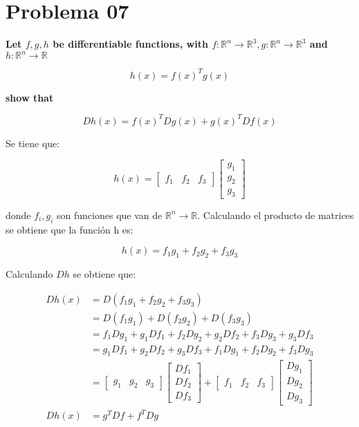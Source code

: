 \section*{Problema 07}

\textbf{Let $f,g,h$ be differentiable functions, with $f: \mathbb{R}^n \rightarrow \mathbb{R}^3, g: \mathbb{R}^n \rightarrow \mathbb{R}^3$ and $h: \mathbb{R}^n \rightarrow \mathbb{R}$}

\begin{equation*}
    h(x) = f(x)^Tg(x)
\end{equation*}

\textbf{show that}

\begin{equation*}
    Dh(x) = f(x)^TDg(x)+g(x)^TDf(x)
\end{equation*}

Se tiene que:

\begin{equation*}
    h(x) = \begin{bmatrix}
        f_1 & f_2 & f_3
    \end{bmatrix} \begin{bmatrix}
        g_1 \\ g_2 \\ g_3
    \end{bmatrix}
\end{equation*}

donde $f_i,g_i$ son funciones que van de $\mathbb{R}^n\rightarrow \mathbb{R}$. Calculando el producto de matrices se obtiene que la función h es:

\begin{equation*}
    h(x) = f_1g_1 + f_2g_2 +f_3g_3
\end{equation*}

Calculando $Dh$ se obtiene que:

\begin{align*}
    Dh(x) & = D( f_1g_1 + f_2g_2 +f_3g_3)                                    \\
          & = D(f_1g_1) + D(f_2g_2) +D(f_3g_3)                               \\
          & = f_1 Dg_1 + g_1 Df_1 + f_2 Dg_2 + g_2 Df_2 + f_3Dg_3 + g_3 Df_3 \\
          & = g_1 Df_1 + g_2 Df_2 + g_3 Df_3 +f_1 Dg_1 + f_2 Dg_2 + f_3 Dg_3 \\
          & = \begin{bmatrix}
        g_1 & g_2 & g_3
    \end{bmatrix}
    \begin{bmatrix}
        Df_1 \\ Df_2 \\ Df_3
    \end{bmatrix} +
    \begin{bmatrix}
        f_1 & f_2 & f_3
    \end{bmatrix}
    \begin{bmatrix}
        Dg_1 \\ Dg_2 \\ Dg_3
    \end{bmatrix}                                                \\
    Dh(x) & = g^T Df + f^T Dg
\end{align*}